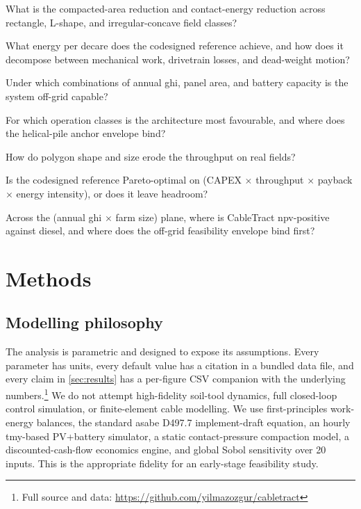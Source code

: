 \documentclass[11pt,a4paper]{article}
\newcommand{\cabletractrepo}{\url{https://github.com/yilmazozgur/cabletract}}
\begin{document}
\begin{description}[leftmargin=2.0em,style=nextline,itemsep=0.25em]
    \item[\gls{rq}1] What is the compacted-area reduction and contact-energy reduction across rectangle, L-shape, and irregular-concave field classes?
    \item[\gls{rq}2] What energy per decare does the codesigned reference achieve, and how does it decompose between mechanical work, drivetrain losses, and dead-weight motion?
    \item[\gls{rq}3] Under which combinations of annual \gls{ghi}, panel area, and battery capacity is the system off-grid capable?
    \item[\gls{rq}4] For which operation classes is the architecture most favourable, and where does the helical-pile anchor envelope bind?
    \item[\gls{rq}5] How do polygon shape and size erode the throughput on real fields?
    \item[\gls{rq}6] Is the codesigned reference Pareto-optimal on (CAPEX $\times$ throughput $\times$ payback $\times$ energy intensity), or does it leave headroom?
    \item[\gls{rq}7] Across the (annual \gls{ghi} $\times$ farm size) plane, where is CableTract \gls{npv}-positive against diesel, and where does the off-grid feasibility envelope bind first?
\end{description}

\section{Methods}\label{sec:methods}

\subsection{Modelling philosophy}\label{sec:philosophy}

The analysis is parametric and designed to expose its assumptions. Every parameter has units, every default value has a citation in a bundled data file, and every claim in \cref{sec:results} has a per-figure CSV companion with the underlying numbers.\footnote{Full source and data: \cabletractrepo} We do not attempt high-fidelity soil-tool dynamics, full closed-loop control simulation, or finite-element cable modelling. We use first-principles work-energy balances, the standard \gls{asabe} D497.7 implement-draft equation, an hourly \gls{tmy}-based PV+battery simulator, a static contact-pressure compaction model, a discounted-cash-flow economics engine, and global Sobol sensitivity over 20 inputs. This is the appropriate fidelity for an early-stage feasibility study.
\end{document}
